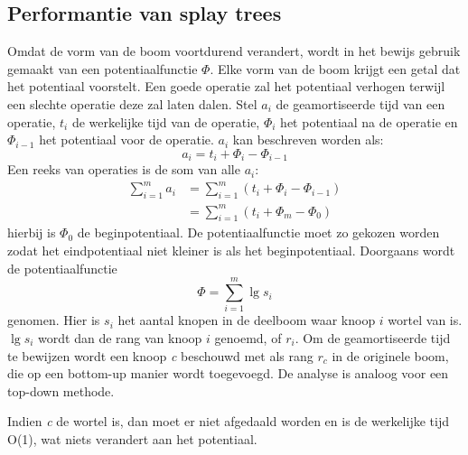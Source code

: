 \documentclass{report}
\begin{document}
	\subsection{Performantie van splay trees}
	Omdat de vorm van de boom voortdurend verandert, wordt in het bewijs gebruik gemaakt van een potentiaalfunctie $\Phi$. Elke vorm van de boom krijgt een getal dat het potentiaal voorstelt. Een goede operatie zal het potentiaal verhogen terwijl een slechte operatie deze zal laten dalen. Stel $a_i$ de geamortiseerde tijd van een operatie, $t_i$ de werkelijke tijd van de operatie, $\Phi_i$ het potentiaal na de operatie en $\Phi_{i - 1}$ het potentiaal voor de operatie. $a_i$ kan beschreven worden als: 
	$$a_i = t_i + \Phi_i - \Phi_{i - 1}$$ Een reeks van operaties is de som van alle $a_i$:
	\begin{equation*}
	\begin{split}
		\sum_{i = 1}^{m} a_i & = \sum_{i = 1}^{m} (t_i + \Phi_i - \Phi_{i - 1}) \\
							   & =  \sum_{i = 1}^{m} (t_i + \Phi_m - \Phi_0)
	\end{split}
	\end{equation*}
	hierbij is $\Phi_0$ de beginpotentiaal. De potentiaalfunctie moet zo gekozen worden zodat het eindpotentiaal niet kleiner is als het beginpotentiaal. Doorgaans wordt de potentiaalfunctie 
	$$\Phi = \sum_{i = 1}^m \lg s_i$$
	genomen. Hier is $s_i$ het aantal knopen in de deelboom waar knoop $i$ wortel van is. $\lg s_i$ wordt dan de rang van knoop $i$ genoemd, of $r_i$. Om de geamortiseerde tijd te bewijzen wordt een knoop \textit{c} beschouwd met als rang $r_c$ in de originele boom, die op een bottom-up manier wordt toegevoegd. De analyse is analoog voor een top-down methode.
	
	
	
	Indien \textit{c} de wortel is, dan moet er niet afgedaald worden en is de werkelijke tijd O(1), wat niets verandert aan het potentiaal.
	

	
	
	
\end{document}
